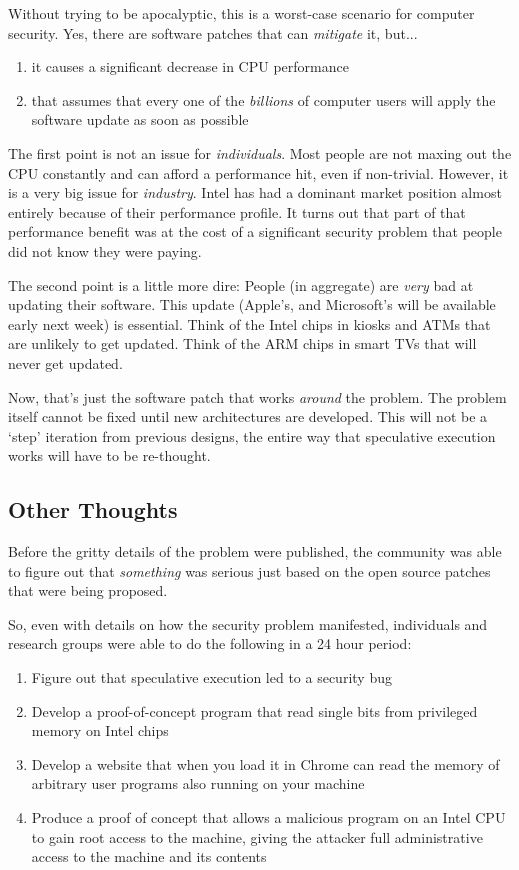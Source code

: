 \documentclass{article}
\begin{document}
Without trying to be apocalyptic, this is a worst-case scenario for computer
security. Yes, there are software patches that can \emph{mitigate} it, but...

\begin{enumerate}
  \item it causes a significant decrease in CPU performance
  \item that assumes that every one of the \emph{billions}
        of computer users will apply the software update as
        soon as possible
\end{enumerate}

The first point is not an issue for \emph{individuals}. Most people are not
maxing out the CPU constantly and can afford a performance hit, even if
non-trivial. However, it is a very big issue for \emph{industry}. Intel has had
a dominant market position almost entirely because of their performance
profile. It turns out that part of that performance benefit was at the cost of
a significant security problem that people did not know they were paying.

The second point is a little more dire: People (in aggregate) are \emph{very}
bad at updating their software. This update (Apple's, and Microsoft's will be
available early next week) is essential. Think of the Intel chips in kiosks and
ATMs that are unlikely to get updated. Think of the ARM chips in smart TVs
that will never get updated.

Now, that's just the software patch that works \emph{around} the problem. The
problem itself cannot be fixed until new architectures are developed. This will
not be a `step' iteration from previous designs, the entire way that
speculative execution works will have to be re-thought.

\subsection*{Other Thoughts}

Before the gritty details of the problem were published, the community was able
to figure out that \emph{something} was serious just based on the open source
patches that were being proposed.

So, even with details on how the security problem manifested, individuals and
research groups were able to do the following in a 24 hour period:

\begin{enumerate}
  \item Figure out that speculative execution led to a security bug
  \item Develop a proof-of-concept program that read single bits from
        privileged memory on Intel chips
  \item Develop a website that when you load it in Chrome can read the
        memory of arbitrary user programs also running on your machine
  \item Produce a proof of concept that allows a malicious program on an Intel
        CPU to gain root access to the machine, giving the attacker full
        administrative access to the machine and its contents
\end{enumerate}
\end{document}
